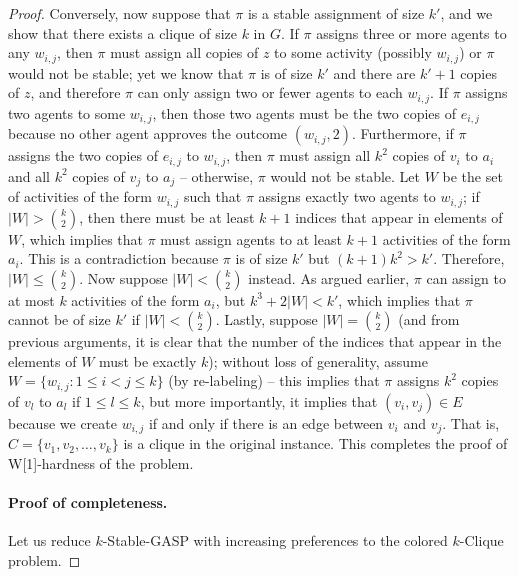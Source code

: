\begin{proof}
	Conversely, now suppose that $\pi$ is a stable assignment of size $k'$, and we show that there exists a clique of size $k$ in $G$. 
	If $\pi$ assigns three or more agents to any $w_{i,j}$, then $\pi$ must assign all copies of $z$ to some activity (possibly $w_{i,j}$) or $\pi$ would not be stable; yet we know that $\pi$ is of size $k'$ and there are $k'+1$ copies of $z$, and therefore $\pi$ can only assign two or fewer agents to each $w_{i,j}$. 
	If $\pi$ assigns two agents to some $w_{i,j}$, then those two agents must be the two copies of $e_{i,j}$ because no other agent approves the outcome $(w_{i,j}, 2)$. 
	Furthermore, if $\pi$ assigns the two copies of $e_{i,j}$ to $w_{i,j}$, then $\pi$ must assign all $k^2$ copies of $v_i$ to $a_i$ and all $k^2$ copies of $v_j$ to $a_j$ -- otherwise, $\pi$ would not be stable. Let $W$ be the set of activities of the form $w_{i,j}$ such that $\pi$ assigns exactly two agents to $w_{i,j}$; if $|W| > \binom{k}{2}$, then there must be at least $k+1$ indices that appear in elements of $W$, which implies that $\pi$ must assign agents to at least $k+1$ activities of the form $a_i$. 
	This is a contradiction because $\pi$ is of size $k'$ but $(k+1)k^2 > k'$. 
	Therefore, $|W| \leq \binom{k}{2}$. 
	Now suppose $|W| < \binom{k}{2}$ instead. 
	As argued earlier, $\pi$ can assign to at most $k$ activities of the form $a_i$, but $k^3 + 2|W| < k'$, which implies that $\pi$ cannot be of size $k'$ if $|W| < \binom{k}{2}$. 
	Lastly, suppose $|W| = \binom{k}{2}$ (and from previous arguments, it is clear that the number of the indices that appear in the elements of $W$ must be exactly $k$); without loss of generality, assume $W = \{w_{i,j} : 1 \leq i < j \leq k\}$ (by re-labeling) -- this implies that $\pi$ assigns $k^2$ copies of $v_l$ to $a_l$ if $1 \leq l \leq k$, but more importantly, it implies that $(v_i, v_j) \in E$ because we create $w_{i,j}$ if and only if there is an edge between $v_i$ and $v_j$. 
	That is, $C = \{v_1, v_2, \dots, v_k\}$ is a clique in the original instance. 
	This completes the proof of W[1]-hardness of the problem.

	\paragraph{Proof of completeness.} 
	Let us reduce $k$-Stable-GASP with increasing preferences to the colored $k$-Clique problem.
	

\end{proof}
